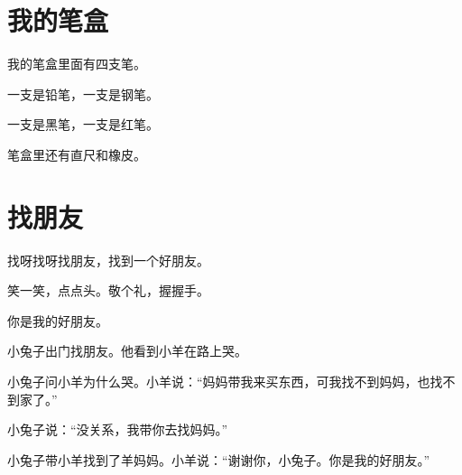 \documentclass[12pt,UTF-8,openany]{ctexbook}
\begin{document}
\chapter{我的笔盒}

\begin{large}
    
    我的笔盒里面有四支笔。
    
    一支是铅笔，一支是钢笔。
    
    一支是黑笔，一支是红笔。
    
    笔盒里还有直尺和橡皮。
    
\end{large}


\clearpage

\begin{center}
    
\end{center}


\hanzibox{}\hanzibox{}\hanzibox{}\hanzibox{}\hspace{1em}\hanzibox{}\hanzibox{}\hanzibox{}\hanzibox{}

\hanzibox{}\hanzibox{}\hanzibox{}\hanzibox{}\hspace{1em}\hanzibox{}\hanzibox{}\hanzibox{}\hanzibox{}

\hanzibox{}\hanzibox{}\hanzibox{}\hanzibox{}\hspace{1em}\hanzibox{}\hanzibox{}\hanzibox{}\hanzibox{}

\hanzibox{}\hanzibox{}\hanzibox{}\hanzibox{}\hspace{1em}




\chapter{找朋友}

\begin{large}
    
    找呀找呀找朋友，找到一个好朋友。
    
    笑一笑，点点头。敬个礼，握握手。
    
    你是我的好朋友。
    
    
    
    小兔子出门找朋友。他看到小羊在路上哭。
    
    小兔子问小羊为什么哭。小羊说：“妈妈带我来买东西，可我找不到妈妈，也找不到家了。”
    
    小兔子说：“没关系，我带你去找妈妈。”
    
    小兔子带小羊找到了羊妈妈。小羊说：“谢谢你，小兔子。你是我的好朋友。”
    
\end{large}
\end{document}
